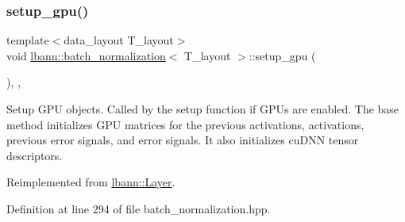 \subsubsection{\texorpdfstring{setup\+\_\+gpu()}{setup\_gpu()}}
{\footnotesize\ttfamily template$<$data\+\_\+layout T\+\_\+layout$>$ \\
void \hyperlink{classlbann_1_1batch__normalization}{lbann\+::batch\+\_\+normalization}$<$ T\+\_\+layout $>$\+::setup\+\_\+gpu (\begin{DoxyParamCaption}{ }\end{DoxyParamCaption})\hspace{0.3cm}{\ttfamily [inline]}, {\ttfamily [override]}, {\ttfamily [virtual]}}

Setup G\+PU objects. Called by the setup function if G\+P\+Us are enabled. The base method initializes G\+PU matrices for the previous activations, activations, previous error signals, and error signals. It also initializes cu\+D\+NN tensor descriptors. 

Reimplemented from \hyperlink{classlbann_1_1Layer_a36aa22ef90ce4de65abe729d38490863}{lbann\+::\+Layer}.



Definition at line 294 of file batch\+\_\+normalization.\+hpp.


